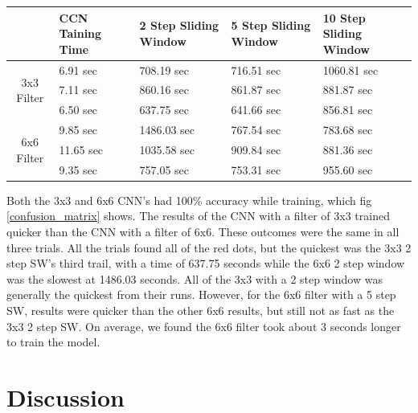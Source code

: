\documentclass[a4paper,10pt]{article}
\begin{document}


\begin{center}
	\begin{tabular}{ |c|p{1.5cm}|p{2.25cm}|p{2.25cm}|p{2.25cm}| } 
		\hline
		 & CCN Taining Time & 2 Step Sliding Window & 5 Step Sliding Window & 10 Step Sliding Window \\
		\hline
		\multirow{3}{4em}{3x3 Filter} & 6.91 sec & 708.19 sec & 716.51 sec & 1060.81 sec \\ 
		
		& 7.11 sec & 860.16 sec & 861.87 sec & 881.87 sec  \\ 
		& 6.50 sec & 637.75 sec & 641.66 sec & 856.81 sec \\ 
		\hline
		\multirow{3}{4em}{6x6 Filter} & 9.85 sec & 1486.03 sec & 767.54 sec & 783.68 sec \\ 
		& 11.65 sec & 1035.58 sec & 909.84 sec & 881.36 sec \\ 
		& 9.35 sec & 757.05 sec & 753.31 sec & 955.60 sec \\ 
		\hline
	\end{tabular}
\end{center}

Both the 3x3 and 6x6 CNN's had 100\% accuracy while training, which fig \ref{confusion_matrix} shows. The results of the CNN with a filter of 3x3 trained quicker than the CNN with a filter of 6x6. These outcomes were the same in all three trials. All the trials found all of the red dots, but the quickest was the 3x3 2 step SW's third trail, with a time of 637.75 seconds while the 6x6 2 step window was the slowest at 1486.03 seconds. All of the 3x3 with a 2 step window was generally the quickest from their runs. However, for the 6x6 filter with a 5 step SW, results were quicker than the other 6x6 results, but still not as fast as the 3x3 2 step SW. On average, we found the 6x6 filter took about 3 seconds longer to train the model.
\section{Discussion}
\end{document}
